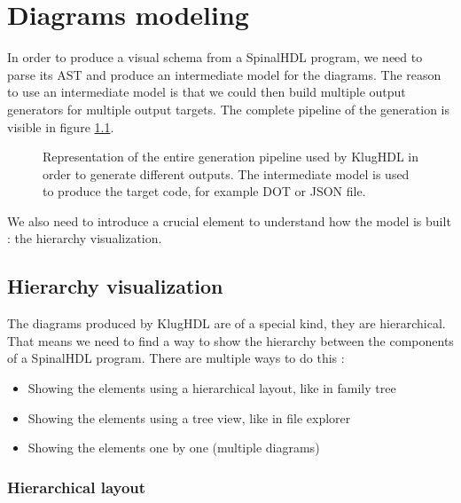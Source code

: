 \chapter{Diagrams modeling}

In order to produce a visual schema from a SpinalHDL program, we need to parse
its AST and produce an intermediate model for the diagrams. The reason to use
an intermediate model is that we could then build multiple output generators
for multiple output targets. The complete pipeline of the generation is visible
in figure \ref{fig:generation-pipeline}.

\begin{figure}[H]
    \centering
    \caption[KlugHDL generation pipeline]{Representation of the entire generation
      pipeline used by KlugHDL in order to generate different outputs. The
      intermediate model is used to produce the target code, for example DOT or
      JSON file.}
    \label{fig:generation-pipeline}
\end{figure}

We also need to introduce a crucial element to understand how the model is
built : the hierarchy visualization.

\section{Hierarchy visualization}

The diagrams produced by KlugHDL are of a special kind, they are hierarchical.
That means we need to find a way to show the hierarchy between the components
of a SpinalHDL program. There are multiple ways to do this :
\begin{itemize}
  \item Showing the elements using a hierarchical layout, like in family tree
  \item Showing the elements using a tree view, like in file explorer
  \item Showing the elements one by one (multiple diagrams)
\end{itemize}

\subsection{Hierarchical layout}
\label{sec:hierarchical-layout}

